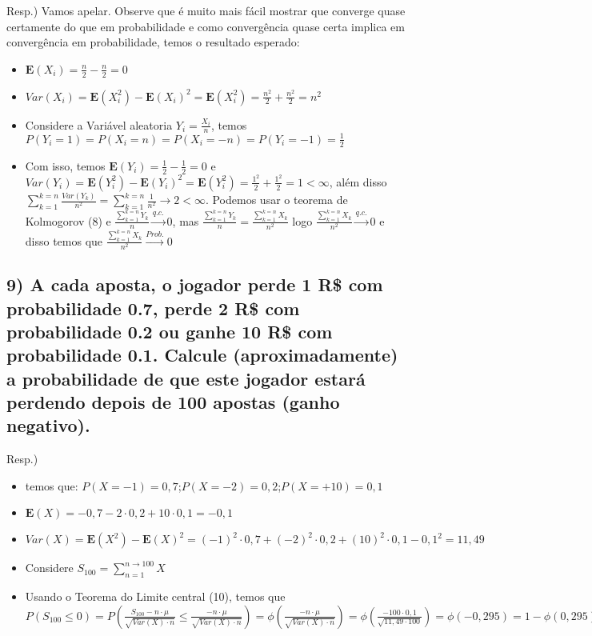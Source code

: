 \documentclass[portuguese]{article}
\begin{document}
Resp.) Vamos apelar. Observe que é muito mais fácil mostrar que converge
quase certamente do que em probabilidade e como convergência quase
certa implica em convergência em probabilidade, temos o resultado
esperado:
\begin{itemize}
\item $\mathbf{E}(X_{i})=\frac{n}{2}-\frac{n}{2}=0$
\item \textbf{$Var(X_{i})=\mathbf{E}(X_{i}^{2})-\mathbf{E}(X_{i})^{2}=\mathbf{E}(X_{i}^{2})=\frac{n^{2}}{2}+\frac{n^{2}}{2}=n^{2}$}
\item Considere a Variável aleatoria $Y_{i}=\frac{X_{i}}{n}$, temos $P(Y_{i}=1)=P(X_{i}=n)=P(X_{i}=-n)=P(Y_{i}=-1)=\frac{1}{2}$
\item Com isso, temos $\mathbf{E}(Y_{i})=\frac{1}{2}-\frac{1}{2}=0$ e \textbf{$Var(Y_{i})=\mathbf{E}(Y_{i}^{2})-\mathbf{E}(Y_{i})^{2}=\mathbf{E}(Y_{i}^{2})=\frac{1^{2}}{2}+\frac{1^{2}}{2}=1<\infty$},
além disso $\sum_{k=1}^{k=n}\frac{Var(Y_{k})}{n^{2}}=\sum_{k=1}^{k=n}\frac{1}{n^{2}}\to2<\infty$.
Podemos usar o teorema de Kolmogorov (8) e $\frac{\sum_{k=1}^{k=n}Y_{k}}{n}\overset{q.c.}{\to}0$,
mas $\frac{\sum_{k=1}^{k=n}Y_{k}}{n}=\frac{\sum_{k=1}^{k=n}X_{k}}{n^{2}}$
logo $\frac{\sum_{k=1}^{k=n}X_{k}}{n^{2}}\overset{q.c.}{\to}0$ e
disso temos que $\frac{\sum_{k=1}^{k=n}X_{k}}{n^{2}}\overset{Prob.}{\to}0$
\end{itemize}

\subsection*{\textcompwordmark{}}


\subsection*{\textmd{9) A cada aposta, o jogador perde 1 R\$ com probabilidade
0.7, perde 2 R\$ com probabilidade 0.2 ou ganhe 10 R\$ com probabilidade
0.1. Calcule (aproximadamente) a probabilidade de que este jogador
estará perdendo depois de 100 apostas (ganho negativo).}}

Resp.)
\begin{itemize}
\item temos que: $P(X=-1)=0,7$;$P(X=-2)=0,2$;$P(X=+10)=0,1$
\item $\mathbf{E}(X)=-0,7-2\cdot0,2+10\cdot0,1=-0,1$
\item $Var(X)=\mathbf{E}(X^{2})-\mathbf{E}(X)^{2}=(-1)^{2}\cdot0,7+(-2)^{2}\cdot0,2+(10)^{2}\cdot0,1-0,1^{2}=11,49$
\item Considere $S_{100}=\sum_{n=1}^{n\to100}X$
\item Usando o Teorema do Limite central (10), temos que $P(S_{100}\le0)=P(\frac{S_{100}-n\cdot\mu}{\sqrt{Var(X)\cdot n}}\le\frac{-n\cdot\mu}{\sqrt{Var(X)\cdot n}})=\phi(\frac{-n\cdot\mu}{\sqrt{Var(X)\cdot n}})=\phi(\frac{-100\cdot0,1}{\sqrt{11,49\cdot100}})=\phi(-0,295)=1-\phi(0,295)\cong0,384$
\end{itemize}
\end{document}
